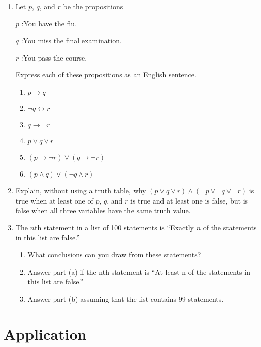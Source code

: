 \documentclass{sig-alternate-05-2015}
\begin{document}
\begin{enumerate}
\item Let $p$, $q$, and $r$ be the propositions

$p$ :You have the flu.

$q$ :You miss the final examination.

$r$ :You pass the course.

Express each of these propositions as an English sentence.
\begin{enumerate}
	\item $p\rightarrow q$
	\item $\neg q \leftrightarrow r$
	\item $q \rightarrow \neg r$
	\item $p \vee q \vee r$
	\item $(p \rightarrow \neg r ) \vee (q \rightarrow \neg r)$
	\item $(p\wedge q)\vee (\neg q \wedge r)$
\end{enumerate}

\item Explain, without using a truth table, why $(p \vee q \vee r) \wedge
(\neg p \vee \neg q \vee \neg r)$ is true when at least one of $p$, $q$, and $r$
is true and at least one is false, but is false when all three
variables have the same truth value.

\item The $n$th statement in a list of 100 statements is \textquotedblleft Exactly
$n$ of the statements in this list are false.\textquotedblright
\begin{enumerate}
	\item What conclusions can you draw from these statements?
	\item Answer part (a) if the nth statement is \textquotedblleft At least n of
	the statements in this list are false.\textquotedblright
	\item Answer part (b) assuming that the list contains 99
	statements.
\end{enumerate}

\end{enumerate}

\section{Application}
\end{document}
